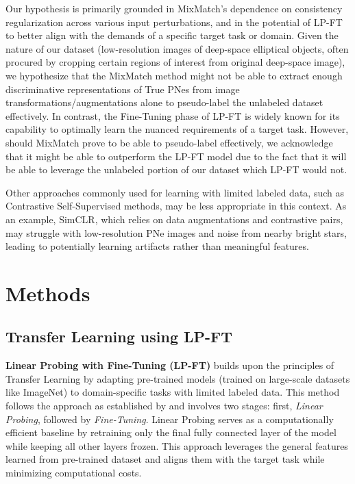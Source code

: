 \documentclass{article}
\begin{document}
Our hypothesis is primarily grounded in MixMatch's dependence on consistency regularization across various input perturbations, and in the potential of LP-FT to better align with the demands of a specific target task or domain. Given the nature of our dataset (low-resolution images of deep-space elliptical objects, often procured by cropping certain regions of interest from original deep-space image), we hypothesize that the MixMatch method might not be able to extract enough discriminative representations of True PNes from image transformations/augmentations alone to pseudo-label the unlabeled dataset effectively. In contrast, the Fine-Tuning phase of LP-FT is widely known for its capability to optimally learn the nuanced requirements of a target task. However, should MixMatch prove to be able to pseudo-label effectively, we acknowledge that it might be able to outperform the LP-FT model due to the fact that it will be able to leverage the unlabeled portion of our dataset which LP-FT would not.

Other approaches commonly used for learning with limited labeled data, such as Contrastive Self-Supervised methods, may be less appropriate in this context. As an example, SimCLR, which relies on data augmentations and contrastive pairs, may struggle with low-resolution PNe images and noise from nearby bright stars, leading to potentially learning artifacts rather than meaningful features. 

\section{Methods}

\subsection{Transfer Learning using LP-FT}

\textbf{Linear Probing with Fine-Tuning (LP-FT)} builds upon the principles of Transfer Learning by adapting pre-trained models (trained on large-scale datasets like ImageNet) to domain-specific tasks with limited labeled data. This method follows the approach as established by \cite{kumar2022lpft} and involves two stages: first, \textit{Linear Probing}, followed by \textit{Fine-Tuning}. Linear Probing serves as a computationally efficient baseline by retraining only the final fully connected layer of the model while keeping all other layers frozen. This approach leverages the general features learned from pre-trained dataset and aligns them with the target task while minimizing computational costs.
\end{document}
